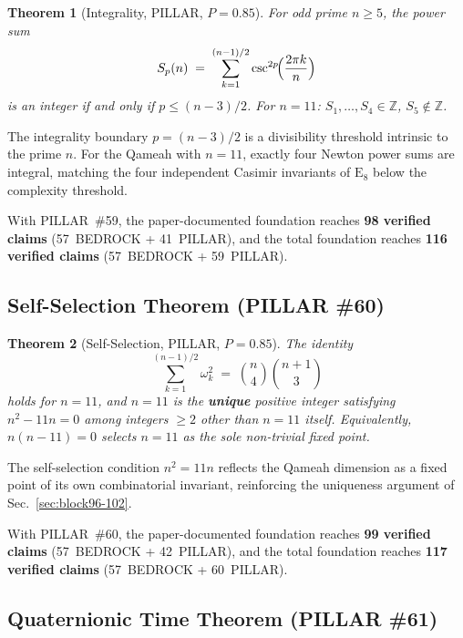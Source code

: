 \documentclass[aps,prd,twocolumn,superscriptaddress,floatfix,nofootinbib]{revtex4-2}
\newtheorem{theorem}{Theorem}
\theoremstyle{definition}
\theoremstyle{remark}
\begin{document}
\begin{theorem}[Integrality, PILLAR, $P{=}0.85$]
\label{thm:integrality}
For odd prime $n \geq 5$, the power sum
\[
S_p(n) \;=\; \sum_{k=1}^{(n-1)/2} \csc^{2p}\!\Bigl(\frac{2\pi k}{n}\Bigr)
\]
is an integer if and only if $p \leq (n-3)/2$.
For $n=11$: $S_1,\ldots,S_4 \in \mathbb{Z}$, $S_5 \notin \mathbb{Z}$.
\end{theorem}

\noindent
The integrality boundary $p=(n-3)/2$ is a divisibility threshold intrinsic to the
prime $n$.  For the Qameah with $n=11$, exactly four Newton power sums are integral,
matching the four independent Casimir invariants of $\mathrm{E}_8$ below the
complexity threshold.

\noindent
With PILLAR~\#59, the paper-documented foundation reaches
\textbf{98 verified claims} (57~BEDROCK + 41~PILLAR), and the total foundation
reaches \textbf{116 verified claims} (57~BEDROCK + 59~PILLAR).

\subsection{Self-Selection Theorem (PILLAR \#60)}
\label{sec:self-selection}

\begin{theorem}[Self-Selection, PILLAR, $P{=}0.85$]
\label{thm:self-selection}
The identity
\[
\sum_{k=1}^{(n-1)/2} \omega_k^2 \;=\; \binom{n}{4}\binom{n+1}{3}
\]
holds for $n=11$, and $n=11$ is the \textbf{unique} positive integer satisfying
$n^2 - 11n = 0$ among integers $\geq 2$ other than $n=11$ itself.  Equivalently,
$n(n-11)=0$ selects $n=11$ as the sole non-trivial fixed point.
\end{theorem}

\noindent
The self-selection condition $n^2=11n$ reflects the Qameah dimension as a fixed
point of its own combinatorial invariant, reinforcing the uniqueness argument of
Sec.~\ref{sec:block96-102}.

\noindent
With PILLAR~\#60, the paper-documented foundation reaches
\textbf{99 verified claims} (57~BEDROCK + 42~PILLAR), and the total foundation
reaches \textbf{117 verified claims} (57~BEDROCK + 60~PILLAR).

\subsection{Quaternionic Time Theorem (PILLAR \#61)}
\label{sec:quaternionic-time}
\end{document}
